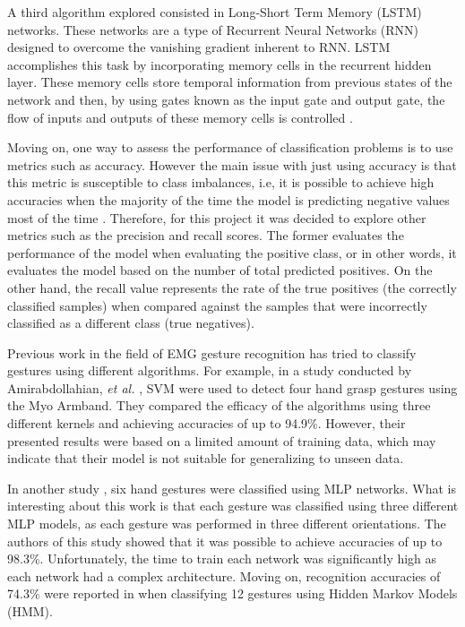 \documentclass[journal]{IEEEtran}
\newcommand{\etal}{\emph{et al.}}
\begin{document}
A third algorithm explored consisted in Long-Short Term Memory (LSTM) networks. These networks are a type of Recurrent Neural Networks (RNN) designed to overcome the vanishing gradient inherent to RNN. LSTM accomplishes this task by incorporating memory cells in the recurrent hidden layer. These memory cells store temporal information from previous states of the network and then, by using gates known as the input gate and output gate, the flow of inputs and outputs of these memory cells is controlled \cite{hochreiter1997}.

Moving on, one way to assess the performance of classification problems is to use metrics such as accuracy. However the main issue with just using accuracy is that this metric is susceptible to class imbalances, i.e, it is possible to achieve high accuracies when the majority of the time the model is predicting negative values most of the time \cite{juba2019}. Therefore, for this project it was decided to explore other metrics such as the precision and recall scores. The former evaluates the performance of the model when evaluating the positive class, or in other words, it evaluates the model based on the number of total predicted positives. On the other hand, the recall value represents the rate of the true positives (the correctly classified samples) when compared against the samples that were incorrectly classified as a different class (true negatives).

Previous work in the field of EMG gesture recognition has tried to classify gestures using different algorithms. For example, in a study conducted by Amirabdollahian, \etal{} \cite{amirabdollahian2017}, SVM were used to detect four hand grasp gestures using the Myo Armband. They compared the efficacy of the algorithms using three different kernels and achieving accuracies of up to 94.9\%. However, their presented results were based on a limited amount of training data, which may indicate that their model is not suitable for generalizing to unseen data. 

In another study \cite{lima2018}, six hand gestures were classified using MLP networks. What is interesting about this work is that each gesture was classified using three different MLP models, as each gesture was performed in three different orientations. The authors of this study showed that it was possible to achieve accuracies of up to 98.3\%. Unfortunately, the time to train each network was significantly high as each network had a complex architecture. Moving on, recognition accuracies of 74.3\% were reported in \cite{georgi2015} when classifying 12 gestures using Hidden Markov Models (HMM). 
\end{document}
